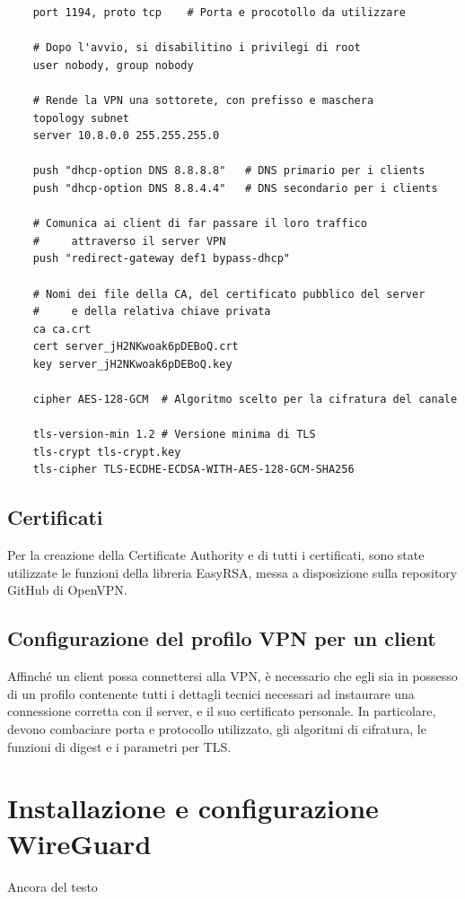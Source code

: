 \begin{verbatim}
    port 1194, proto tcp    # Porta e procotollo da utilizzare
    
    # Dopo l'avvio, si disabilitino i privilegi di root
    user nobody, group nobody   

    # Rende la VPN una sottorete, con prefisso e maschera
    topology subnet         
    server 10.8.0.0 255.255.255.0

    push "dhcp-option DNS 8.8.8.8"   # DNS primario per i clients
    push "dhcp-option DNS 8.8.4.4"   # DNS secondario per i clients

    # Comunica ai client di far passare il loro traffico 
    #     attraverso il server VPN
    push "redirect-gateway def1 bypass-dhcp"   

    # Nomi dei file della CA, del certificato pubblico del server 
    #     e della relativa chiave privata
    ca ca.crt
    cert server_jH2NKwoak6pDEBoQ.crt
    key server_jH2NKwoak6pDEBoQ.key
    
    cipher AES-128-GCM  # Algoritmo scelto per la cifratura del canale

    tls-version-min 1.2 # Versione minima di TLS
    tls-crypt tls-crypt.key
    tls-cipher TLS-ECDHE-ECDSA-WITH-AES-128-GCM-SHA256  
\end{verbatim}

\subsection{Certificati}
Per la creazione della Certificate Authority e di tutti i certificati, sono state utilizzate le funzioni della libreria EasyRSA, messa a disposizione sulla repository GitHub di OpenVPN.

\subsection{Configurazione del profilo VPN per un client}
Affinché un client possa connettersi alla VPN, è necessario che egli sia in possesso di un profilo contenente tutti i dettagli tecnici necessari ad instaurare una connessione corretta con il server, e il suo certificato personale. In particolare, devono combaciare porta e protocollo utilizzato, gli algoritmi di cifratura, le funzioni di digest e i parametri per TLS.



\section{Installazione e configurazione WireGuard}
Ancora del testo
